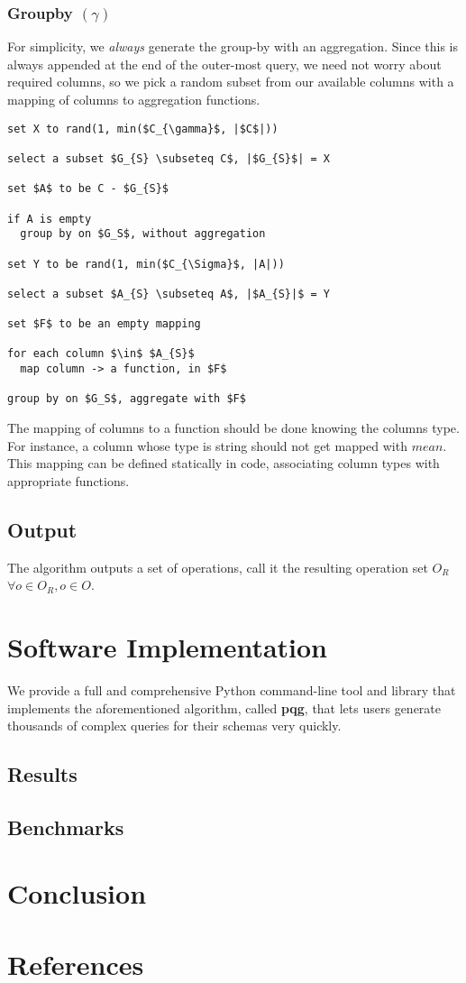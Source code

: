 \documentclass[10pt, twocolumn]{article}
\begin{document}
\subsubsection*{Groupby $(\gamma)$}

For simplicity, we \textit{always} generate the group-by with an aggregation. Since this is always appended at the end of the outer-most query, we need not worry about required columns, so we pick a random subset from our available columns with a mapping of columns to aggregation functions.

\spacing
\begin{lstlisting}
set X to rand(1, min($C_{\gamma}$, |$C$|))

select a subset $G_{S} \subseteq C$, |$G_{S}$| = X

set $A$ to be C - $G_{S}$

if A is empty
  group by on $G_S$, without aggregation

set Y to be rand(1, min($C_{\Sigma}$, |A|))

select a subset $A_{S} \subseteq A$, |$A_{S}|$ = Y

set $F$ to be an empty mapping

for each column $\in$ $A_{S}$
  map column -> a function, in $F$

group by on $G_S$, aggregate with $F$
\end{lstlisting}

\spacing
\noindent
The mapping of columns to a function should be done knowing the columns type. For instance, a column whose type is string should not get mapped with $mean$. This mapping can be defined statically in code, associating column types with appropriate functions.

\subsection*{Output}

The algorithm outputs a set of operations, call it the resulting operation set $O_{R}$  $\forall o \in O_{R}, o \in O$.

\section{Software Implementation}

We provide a full and comprehensive Python command-line tool and library that implements the aforementioned algorithm, called \textbf{pqg}, that lets users generate thousands of complex queries for their schemas very quickly.

\subsection*{Results}

\subsection*{Benchmarks}

\section{Conclusion}

\section{References}
\end{document}
